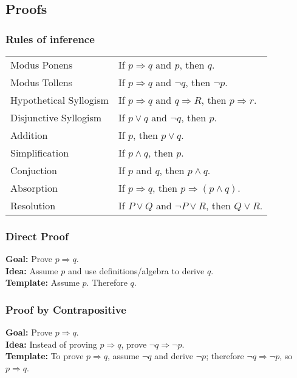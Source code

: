 \documentclass[5pt]{article}
\begin{document}
\begin{multicols}{2}
\subsection{Proofs}
\subsubsection{Rules of inference}
\begin{tabular}{ll}
    Modus Ponens            &   If $p\Rightarrow q$ and $p$, then $q$.\\
    Modus Tollens           &   If $p\Rightarrow q$ and $\lnot q$, then $\lnot p$.\\
    Hypothetical Syllogism  &   If $p\Rightarrow q$ and $q\Rightarrow R$, then $p\Rightarrow r$.\\
    Disjunctive Syllogism   &   If $p\lor q$ and $\lnot q$, then $p$.\\
    Addition                &   If $p$, then $p\lor q$.\\
    Simplification          &   If $p\land q$, then $p$.\\
    Conjuction              &   If $p$ and $q$, then $p\land q$.\\
    Absorption              &   If $p\Rightarrow q$, then $p\Rightarrow (p\land q)$.\\
    Resolution              &   If $P\lor Q$ and $\lnot P\lor R$, then $Q\lor R$.
\end{tabular}

\subsubsection{Direct Proof}
\textbf{Goal:} Prove $p\Rightarrow q$.\\
\textbf{Idea:} Assume $p$ and use definitions/algebra to derive $q$.\\
\textbf{Template:} Assume $p$. \; \;\; Therefore $q$.\\

\subsubsection{Proof by Contrapositive}
\textbf{Goal:} Prove $p\Rightarrow q$.\\
\textbf{Idea:} Instead of proving $p\Rightarrow q$, prove $\lnot q\Rightarrow \lnot p$.\\
\textbf{Template:} To prove $p\Rightarrow q$, assume $\lnot q$ and derive $\lnot p$; therefore $\lnot q\Rightarrow \lnot p$, so $p\Rightarrow q$.\\


\end{multicols}
\end{document}
